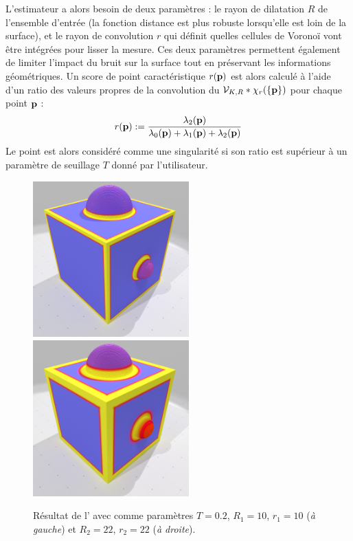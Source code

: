L'estimateur \VCM a alors besoin de deux paramètres : le rayon de dilatation $R$
de l'ensemble d'entrée (la fonction distance est plus robuste lorsqu'elle est
loin de la surface), et le rayon de convolution $r$ qui définit quelles cellules
de Voronoï vont être intégrées pour lisser la mesure. Ces deux paramètres
permettent également de limiter l'impact du bruit sur la surface tout en
préservant les informations géométriques. Un score de point caractéristique
$r(\mathbf{p})$ est alors calculé à l'aide d'un ratio des valeurs propres de la
convolution du \VCM $\mathcal{V}_{K,R} \ast \chi_r(\{\mathbf{p}\})$ pour chaque point
$\mathbf{p}$ :
%
\begin{equation}
  r(\mathbf{p}) := \frac{\lambda_2(\mathbf{p})}{\lambda_0(\mathbf{p}) + \lambda_1(\mathbf{p}) + \lambda_2(\mathbf{p})}
  \label{eq:VCM-ratio-eigenvalues}
\end{equation}
%
Le point est alors considéré comme une singularité si son ratio est supérieur à
un paramètre de seuillage $T$ donné par l'utilisateur.

\begin{figure}[ht]
  \centering
  \includegraphics[height=6cm]{images/Feature/CubeSphere_VCM_r_10}
  \includegraphics[height=6cm]{images/Feature/CubeSphere_VCM_r_22}
  \caption[Résultat de l']{Résultat de
  l' avec comme paramètres $T = 0.2$, $R_1 =
  10$, $r_1 = 10$ (\emph{à gauche}) et $R_2 = 22$, $r_2 = 22$ (\emph{à
  droite}).}\label{fig:VCM-cubesphere}
\end{figure}

